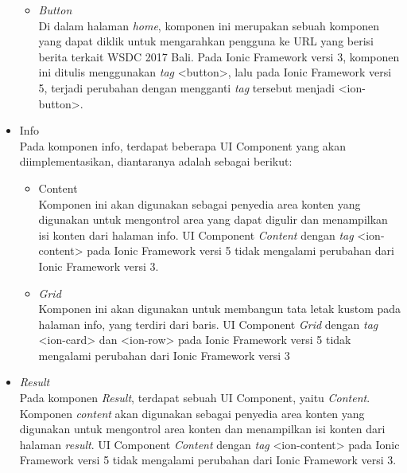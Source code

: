 \begin{itemize}
\begin{itemize}
\newpage
			
			\item \textit{Button} \\
			Di dalam halaman \textit{home}, komponen ini merupakan sebuah komponen yang dapat diklik untuk mengarahkan pengguna ke URL yang berisi berita terkait WSDC 2017 Bali. Pada Ionic Framework versi 3, komponen ini ditulis menggunakan \textit{tag} <button>, lalu pada Ionic Framework versi 5, terjadi perubahan dengan mengganti \textit{tag} tersebut menjadi <ion-button>.
		\end{itemize}
		
	\item Info \\
	Pada komponen info, terdapat beberapa UI Component yang akan diimplementasikan, diantaranya adalah sebagai berikut:
		\begin{itemize}
			\item Content \\
		Komponen ini akan digunakan sebagai penyedia area konten yang digunakan untuk mengontrol area yang dapat digulir dan menampilkan isi konten dari halaman info. UI Component \textit{Content} dengan \textit{tag} <ion-content> pada Ionic Framework versi 5 tidak mengalami perubahan dari Ionic Framework versi 3.
			\item \textit{Grid} \\
		Komponen ini akan digunakan untuk membangun tata letak kustom pada halaman info, yang terdiri dari baris. UI Component \textit{Grid} dengan \textit{tag} <ion-card> dan <ion-row> pada Ionic Framework versi 5 tidak mengalami perubahan dari Ionic Framework versi 3
		\end{itemize}
		
	\item \textit{Result} \\ 
	Pada komponen \textit{Result}, terdapat sebuah UI Component, yaitu \textit{Content}. Komponen \textit{content} akan digunakan sebagai penyedia area konten yang digunakan untuk mengontrol area konten dan menampilkan isi konten dari halaman \textit{result}. UI Component \textit{Content} dengan \textit{tag} <ion-content> pada Ionic Framework versi 5 tidak mengalami perubahan dari Ionic Framework versi 3. 


\end{itemize}
